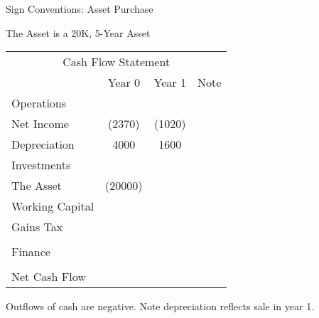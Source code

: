 \documentclass[ignorenonframetext,]{beamer}
\begin{document}
\begin{frame}{Sign Conventions: Asset Purchase}

The Asset is a 20K, 5-Year Asset

\begin{table}
\begin{tabular}{l||c|c||p{3cm}}
        \multicolumn{4}{c}{Cash Flow Statement}\\
  &Year 0  &Year 1  &Note\\        
    Operations& &   &\\
    \hspace{.25in}Net Income    &   (2370)& (1020)&\\
    \hspace{.25in}Depreciation  &   4000&   1600&\\
    Investments &   &   &\\
\hspace{.25in}The Asset         &(20000)    &   &\\
\hspace{.25in}Working Capital   &   &   &\\
        \hspace{.25in}Gains Tax &   &   &\\
            &   &   &\\
        
    Finance &   &   &\\
            &   &   &\\
        \hline
        Net Cash Flow   &   &   &\\
\end{tabular}
\end{table}

Outflows of cash are negative. Note depreciation reflects sale in year
1.

\end{frame}
\end{document}

